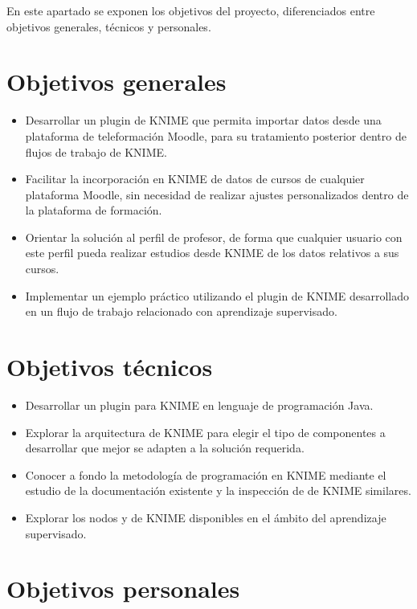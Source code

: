 En este apartado se exponen los objetivos del proyecto, diferenciados entre objetivos generales, técnicos y personales. 

\section{Objetivos generales}

\begin{itemize}
	\item Desarrollar un plugin de KNIME que permita importar datos desde una plataforma 
	de teleformación Moodle, para su tratamiento posterior dentro de flujos de trabajo de KNIME.
	\item Facilitar la incorporación en KNIME de datos de cursos de cualquier plataforma Moodle, 
	sin necesidad de realizar ajustes personalizados dentro de la plataforma de formación. 
    \item Orientar la solución al perfil de profesor, de forma que cualquier usuario con este
	 perfil pueda realizar estudios desde KNIME de los datos relativos a sus cursos. 
    \item Implementar un ejemplo práctico utilizando el plugin de KNIME desarrollado en un
	 flujo de trabajo relacionado con aprendizaje supervisado.
\end{itemize}

\section{Objetivos técnicos}

\begin{itemize}
	\item Desarrollar un plugin para KNIME en lenguaje de programación Java. 
	\item Explorar la arquitectura de KNIME para elegir el tipo de componentes a desarrollar que mejor se adapten a la solución requerida.
	\item Conocer a fondo la metodología de programación en KNIME mediante el estudio de la documentación existente y la inspección de  de KNIME similares.
	\item Explorar los nodos y  de KNIME disponibles en el ámbito del aprendizaje supervisado.
\end{itemize}

\section{Objetivos personales}

